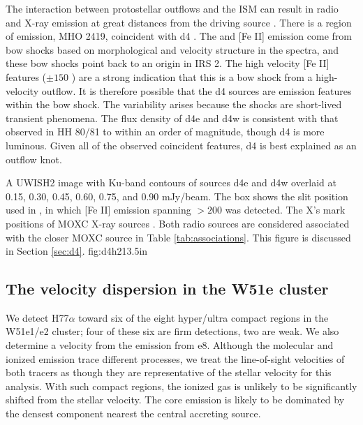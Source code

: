 The interaction between protostellar outflows and the ISM can result in radio
and X-ray emission at great distances from the driving source \citep[e.g.,
HH80/81][]{Lopez-Santiago2013a,Masque2015a}.  There is a region of \hh emission,
MHO 2419, coincident with d4 \citep[Figure
\ref{fig:d4h2}][]{Hodapp2002a,Froebrich2011a}.  The \hh and [Fe II] emission
come from bow shocks based on morphological and velocity structure in the
\citet{Hodapp2002a} spectra, and these bow shocks point back to an origin in
IRS 2.  The high velocity [Fe II] features ($\pm150$ \kms) are a strong
indication that this is a bow shock from a high-velocity outflow.  It is
therefore possible that the d4 sources are emission features within the bow
shock.  The variability arises because the shocks are short-lived transient
phenomena.  The flux density of d4e and d4w is consistent with that observed
in HH 80/81 \citep{Masque2015a} to within an order of magnitude, though d4
is more luminous.  Given all of the observed coincident features, d4 is best
explained as an outflow knot.  

{A UWISH2 \hh image with Ku-band contours of sources d4e and d4w overlaid at
0.15, 0.30, 0.45, 0.60, 0.75, and 0.90 mJy/beam.  The box shows the slit
position used in \citet{Hodapp2002a}, in which [Fe II] emission spanning
$>200$ \kms was detected.  The X's mark positions of MOXC X-ray
sources \citep{Townsley2014a}.  Both radio sources are considered
associated with the closer MOXC source in Table \ref{tab:associations}.
This figure is discussed in Section \ref{sec:d4}.
}
{fig:d4h2}{1}{3.5in}

\subsection{The velocity dispersion in the W51e cluster}
\label{sec:vdisp}
We detect H77$\alpha$ toward six of the eight hyper/ultra compact \hii regions
in the W51e1/e2 cluster; four of these six are firm detections, two
are weak.  We also determine a velocity from the \formaldehyde emission from
e8.  Although the molecular and ionized emission trace different
processes, we treat the line-of-sight velocities of both tracers as though they
are representative of the stellar velocity for this analysis.  With such
compact \hii regions, the ionized gas is unlikely to be significantly shifted
from the stellar velocity.  The core emission is likely to be dominated by the
densest component nearest the central accreting source.

